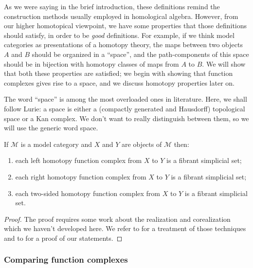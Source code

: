 \begin{refsection}
As we were saying in the brief introduction, these definitions remind the construction methods usually employed in homological algebra. However, from our higher homotopical viewpoint, we have some properties that those definitions should satisfy, in order to be \emph{good} definitions. For example, if we think model categories as presentations of a homotopy theory, the maps between two objects $A$ and $B$ should be organized in a ``space'', and the path-components of this space should be in bijection with homotopy classes of maps from $A$ to $B$. We will show that both these properties are satisfied; we begin with showing that function complexes gives rise to a space, and we discuss homotopy properties later on.

\begin{rmk}
The word ``space'' is among the most overloaded ones in literature. Here, we shall follow Lurie: a space is either a (compactly generated and Hausdorff) topological space or a Kan complex. We don't want to really distinguish between them, so we will use the generic word space.
\end{rmk}

\begin{prop}
If $\mathcal M$ is a model category and $X$ and $Y$ are objects of $\mathcal M$ then:
\begin{enumerate}
\item each left homotopy function complex from $X$ to $Y$ is a fibrant simplicial set;
\item each right homotopy function complex from $X$ to $Y$ is a fibrant simplicial set;
\item each two-sided homotopy function complex from $X$ to $Y$ is a fibrant simplicial set.
\end{enumerate}
\end{prop}

\begin{proof}
The proof requires some work about the realization and corealization which we haven't developed here. We refer to \cite[Ch. 16.3]{hirschhorn} for a treatment of those techniques and to \cite[Propositions 17.1.3, 17.2.3, 17.3.2]{hirschhorn} for a proof of our statements.
\end{proof}

\subsubsection*{Comparing function complexes}


\end{refsection}
